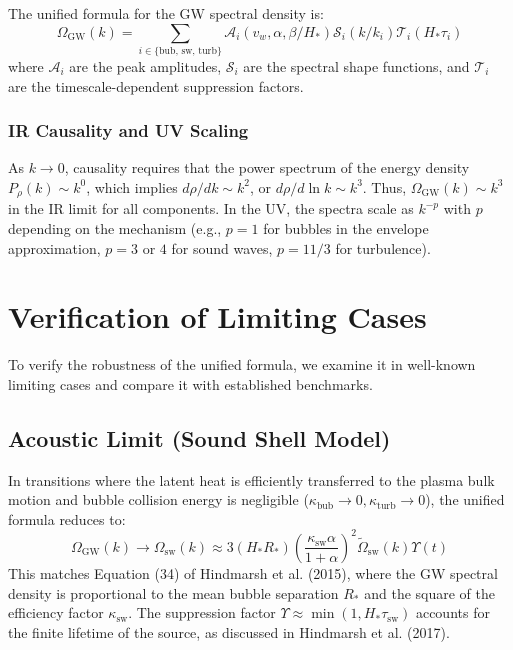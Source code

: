 \documentclass{article}
\begin{document}
The unified formula for the GW spectral density is:
\begin{equation}
    \Omega_{\text{GW}}(k) = \sum_{i \in \{\text{bub, sw, turb}\}} \mathcal{A}_i(v_w, \alpha, \beta/H_*) \mathcal{S}_i(k/k_i) \mathcal{T}_i(H_* \tau_i)
\end{equation}
where $\mathcal{A}_i$ are the peak amplitudes, $\mathcal{S}_i$ are the spectral shape functions, and $\mathcal{T}_i$ are the timescale-dependent suppression factors.

\subsubsection{IR Causality and UV Scaling}
As $k \to 0$, causality requires that the power spectrum of the energy density $P_{\rho}(k) \sim k^0$, which implies $d\rho/dk \sim k^2$, or $d\rho/d\ln k \sim k^3$. Thus, $\Omega_{\text{GW}}(k) \sim k^3$ in the IR limit for all components. In the UV, the spectra scale as $k^{-p}$ with $p$ depending on the mechanism (e.g., $p=1$ for bubbles in the envelope approximation, $p=3$ or $4$ for sound waves, $p=11/3$ for turbulence).

\section{Verification of Limiting Cases}

To verify the robustness of the unified formula, we examine it in well-known limiting cases and compare it with established benchmarks.

\subsection{Acoustic Limit (Sound Shell Model)}
In transitions where the latent heat is efficiently transferred to the plasma bulk motion and bubble collision energy is negligible ($\kappa_{\text{bub}} \to 0, \kappa_{\text{turb}} \to 0$), the unified formula reduces to:
\begin{equation}
    \Omega_{\text{GW}}(k) \to \Omega_{\text{sw}}(k) \approx 3 (H_* R_*) \left( \frac{\kappa_{\text{sw}} \alpha}{1 + \alpha} \right)^2 \tilde{\Omega}_{\text{sw}}(k) \Upsilon(t)
\end{equation}
This matches Equation (34) of Hindmarsh et al. (2015), where the GW spectral density is proportional to the mean bubble separation $R_*$ and the square of the efficiency factor $\kappa_{\text{sw}}$. The suppression factor $\Upsilon \approx \min(1, H_* \tau_{\text{sw}})$ accounts for the finite lifetime of the source, as discussed in Hindmarsh et al. (2017).
\end{document}
